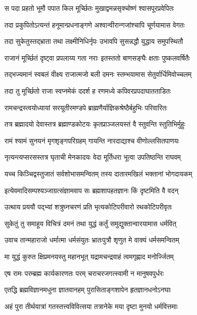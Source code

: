\twolineshloka
{स पदा प्रहतो भूमौ पपात किल मूर्च्छितः}
{मुखाद्वमन्नसृक्चोष्णं श्वासपूरप्रवेपितः}%

\twolineshloka
{तदा प्रकुपितोऽत्यन्तं हनूमान्प्रधनाङ्गणे}
{अश्वान्वीरान्गजांश्चापि चूर्णयामास वेगतः}%

\twolineshloka
{तदा सुकेतुस्तद्भ्राता तथा लक्ष्मीनिधिर्नृपः}
{उभावपि सुसन्नद्धौ युद्धाय समुपस्थितौ}%

\twolineshloka
{राजानं मूर्च्छितं दृष्ट्वा प्रपलाय्य गता नराः}
{इतस्ततो बाणसङ्घैः क्षताः पुष्कलवर्षितैः}%

\twolineshloka
{तद्भज्यमानं स्वबलं वीक्ष्य राजात्मजो बली}
{दमनः स्तम्भयामास सेतुर्वार्धिमिवोच्चलम्}%

\twolineshloka
{तदा तु मूर्च्छितो राजा स्वप्नमेकं ददर्श ह}
{रणमध्ये कपिवरप्रपदाघातताडितः}%

\twolineshloka
{रामचन्द्रस्त्वयोध्यायां सरयूतीरमण्डपे}
{ब्राह्मणैर्याज्ञिकश्रेष्ठैर्बहुभिः परिवारितः}%

\twolineshloka
{तत्र ब्रह्मादयो देवास्तत्र ब्रह्माण्डकोटयः}
{कृतप्राञ्जलयस्तं वै स्तुवन्ति स्तुतिभिर्मुहुः}%

\twolineshloka
{रामं श्यामं सुनयनं मृगशृङ्गपरिग्रहम्}
{गायन्ति नारदाद्याश्च वीणोल्लसितपाणयः}%

\twolineshloka
{नृत्यन्त्यप्सरसस्तत्र घृताची मेनकादयः}
{वेदा मूर्तिधरा भूत्वा उपतिष्ठन्ति राघवम्}%

\twolineshloka
{यच्च किञ्चिद्वस्तुजातं सर्वशोभासमन्वितम्}
{तस्य दातारमखिलं भक्तानां भोगदायकम्}%

\twolineshloka
{इत्येवमादिसम्पश्यञ्जाग्रत्संज्ञामवाप सः}
{ब्रह्मशापहतज्ञानः किं दृष्टमिति वै वदन्}%

\twolineshloka
{उत्थाय प्रययौ पद्भ्यां शत्रुघ्नचरणं प्रति}
{भृत्यकोटिपरीवारो रथकोटिपरीवृतः}%

\twolineshloka
{सुकेतुं तु समाहूय विचित्रं दमनं तथा}
{युद्धं कर्तुं समुद्युक्तान्वारयामास धर्मवित्}%

\twolineshloka
{उवाच तान्महाराजो धर्मात्मा धर्मसंयुतः}
{भ्रातःपुत्रौ शृणुत मे वाक्यं धर्मसमन्वितम्}%

\twolineshloka
{मा युद्धं कुरुत क्षिप्रमनयस्तु महानभूत्}
{यद्रामचन्द्रवाहं त्वमगृह्णाद मनोर्ज्जितम्}%

\twolineshloka
{एष रामः परम्ब्रह्म कार्यकारणतः परम्}
{चराचरजगत्स्वामी न मानुषवपुर्धरः}%

\twolineshloka
{एतद्धि ब्रह्मविज्ञानमधुना ज्ञातवानहम्}
{पुरासिताङ्गशापेन हृतज्ञानधनोऽनघाः}%

\twolineshloka
{अहं पुरा तीर्थयात्रां गतस्तत्त्वविवित्सया}
{तत्रानेके मया दृष्टा मुनयो धर्मवित्तमाः}%

